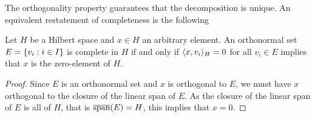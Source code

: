 \documentclass[../thesis.tex]{subfiles}
\begin{document}
The orthogonality property guarantees that the decomposition is unique. %
An equivalent restatement of completeness is the following
\begin{lemma}\label{lem:ONB_alternative_def}
    Let $H$ be a Hilbert space and $x\in H$ an arbitrary element. An orthonormal set $E = \{v_i: i \in I\}$ is complete in $H$ if and only if $\langle x, v_i\rangle_{H} = 0$ for all $v_i\in E$ implies that $x$ is the zero-element of $H$.
\end{lemma}
\begin{proof}
    Since $E$ is an orthonormal set and $x$ is orthogonal to $E$, we must have $x$ orthogonal to the closure of the linear span of $E$. As the closure of the linear span of $E$ is all of $H$, that is $\overline{\operatorname{span}}(E) = H$, this implies that $x=0$. %
\end{proof}

\end{document}
